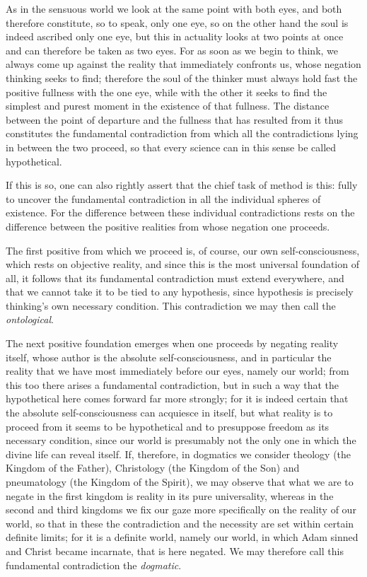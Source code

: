 \documentclass[12pt]{book}
\newcommand{\opage}[1]{\marginnote{\footnotesize\textit{[#1]}}}
\begin{document}
As in the sensuous world we look at the same point with both eyes, and both
therefore constitute, so to speak, only one eye, so on the other hand the soul
is indeed ascribed only one eye, but this in actuality looks at two points at
once and can therefore be taken as two eyes. For as soon as we begin to think,
we always come up against the reality that immediately confronts us, whose
negation thinking seeks to find; therefore the soul of the thinker must always
hold fast the positive fullness with the one eye, while with the other it seeks
to find the simplest and purest moment in the existence of that fullness. The
distance between the point of departure and the fullness that has resulted
from it thus constitutes the fundamental contradiction from which all the
contradictions lying in between the two proceed, so that every science can in
this sense be called hypothetical.

If this is so, one can also rightly assert that the chief task of method is
this: fully to uncover the fundamental contradiction in all the individual
spheres of existence. For the difference between these individual
contradictions rests on the difference between the positive realities from
whose negation one proceeds.

The first positive from which we proceed is, of course, our own
self-consciousness, which rests on objective reality, and since this is the
most universal foundation of all, it follows that its fundamental contradiction
must extend everywhere, and that we cannot take it to be tied to any
hypothesis, since hypothesis is precisely thinking's own necessary condition.
This contradiction we may then call the \emph{ontological}.

\opage{41} The next positive foundation emerges when one proceeds by negating
reality itself, whose author is the absolute self-consciousness, and in
particular the reality that we have most immediately before our eyes, namely
our world; from this too there arises a fundamental contradiction, but in such
a way that the hypothetical here comes forward far more strongly; for it is
indeed certain that the absolute self-consciousness can acquiesce in itself,
but what reality is to proceed from it seems to be hypothetical and to
presuppose freedom as its necessary condition, since our world is presumably
not the only one in which the divine life can reveal itself. If, therefore, in
dogmatics we consider theology (the Kingdom of the Father), Christology (the
Kingdom of the Son) and pneumatology (the Kingdom of the Spirit), we may observe
that what we are to negate in the first kingdom is reality in its pure
universality, whereas in the second and third kingdoms we fix our gaze more
specifically on the reality of our world, so that in these the contradiction
and the necessity are set within certain definite limits; for it is a definite
world, namely our world, in which Adam sinned and Christ became incarnate, that
is here negated. We may therefore call this fundamental contradiction the
\emph{dogmatic}.
\end{document}
